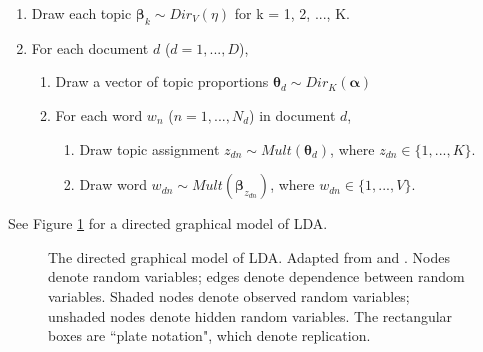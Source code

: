 \documentclass{article}
\begin{document}
\begin{enumerate}
  \item Draw each topic $\boldsymbol{\beta}_k \sim Dir_V(\eta)$ for k = 1, 2, ..., K.
  \item For each document $d$ ($d = 1, ..., D$),
  \begin{enumerate}
    \item Draw a vector of topic proportions $\boldsymbol{\theta}_d \sim Dir_K(\boldsymbol{\alpha})$
    \item For each word $w_n$ ($n = 1, ..., N_d$) in document $d$,
    \begin{enumerate}
      \item Draw topic assignment $z_{dn} \sim Mult(\boldsymbol{\theta}_d)$, where $z_{dn} \in \{1, ..., K\}$.
      \item Draw word $w_{dn} \sim Mult(\boldsymbol{\beta}_{z_{dn}})$, where $w_{dn} \in \{1, ..., V\}$.
    \end{enumerate}
  \end{enumerate}
\end{enumerate}

See Figure \ref{fig:gaphical_model_lda} for a directed graphical model of LDA.

\begin{figure}
  \centering
  \caption{The directed graphical model of LDA. Adapted from \cite{blei2012probablistic} and \cite{blei2009topic}. Nodes denote random variables; edges denote dependence between random variables. Shaded nodes denote observed random variables; unshaded nodes denote hidden random variables. The rectangular boxes are ``plate notation", which denote replication.}
  \label{fig:gaphical_model_lda}
\end{figure}
\end{document}
